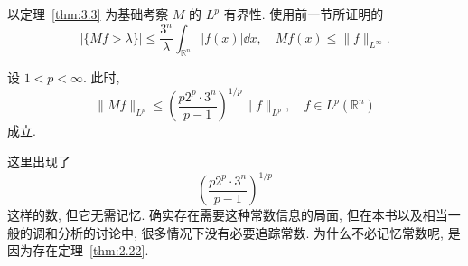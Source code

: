 以定理~\ref{thm:3.3} 为基础考察 $M$ 的 $L^{p}$ 有界性. 使用前一节所证明的
\[
|\{Mf > \lambda\}| \leq \frac{3^{n}}{\lambda}\int_{\mathbb{R}^{n}}|f(x)|\dd x, \quad Mf(x) \leq \|f\|_{L^{\infty}}.
\]

\begin{theorem}\label{thm:3.4}
设 $1 < p < \infty$. 此时,
\begin{equation}\tag{3.9}
\|Mf\|_{L^{p}} \leq \left(\frac{p2^{p}\cdot 3^{n}}{p-1}\right)^{1/p}\|f\|_{L^{p}}, \quad f \in L^{p}(\mathbb{R}^{n})
\label{eq:3.9}
\end{equation}
成立.
\end{theorem}

这里出现了
\[
\left(\frac{p2^{p}\cdot 3^{n}}{p-1}\right)^{1/p}
\]
这样的数, 但它无需记忆. 确实存在需要这种常数信息的局面, 但在本书以及相当一般的调和分析的讨论中, 很多情况下没有必要追踪常数. 为什么不必记忆常数呢, 是因为存在定理~\ref{thm:2.22}.


